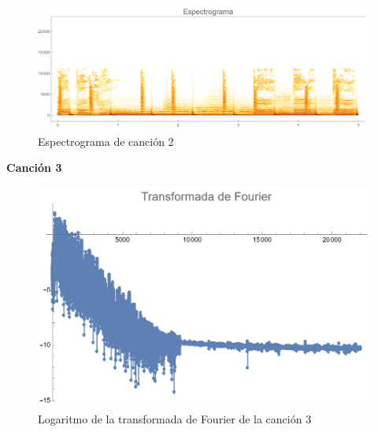 \documentclass[12pt, letterpaper]{article}
\begin{document}
\begin{figure}[H]
  \centering
  \includegraphics[width=.9\linewidth]{imgs/Cancion2/espectrograma.png}
  \caption{Espectrograma de canción 2}
  \label{fig:02i}
\end{figure}

\textbf{\large{Canción 3}}
\begin{figure}[H]
  \centering
  \includegraphics[width=0.7\linewidth]{imgs/Cancion3/transformada.png}
  \caption{Logaritmo de la transformada de Fourier de la canción 3}
  \label{fig:03a}
\end{figure}
\end{document}
